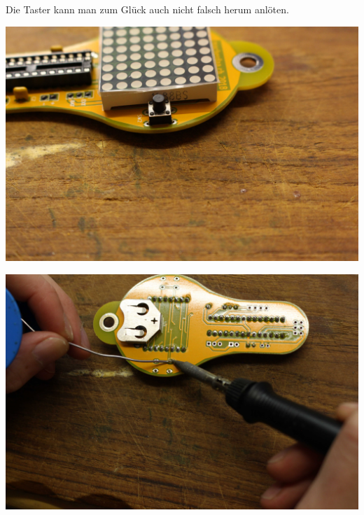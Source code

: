 \documentclass{article}
\begin{document}
Die Taster kann man zum Glück auch nicht falsch herum anlöten.

\begin{minipage}[b]{0.5\textwidth}
	\includegraphics[width=\textwidth]{Bilder/IMG_5587.JPG}
	\label{fig:}
\end{minipage}
\begin{minipage}[b]{0.5\textwidth}
	\includegraphics[width=\textwidth]{Bilder/IMG_5588.JPG}
	\label{fig:}
\end{minipage}
\end{document}
